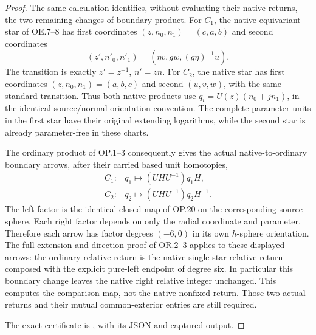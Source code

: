 \begin{proof}
\par\nobreak

The same calculation identifies, without evaluating their native
returns, the two remaining changes of boundary product. For \(C_1\),
the native equivariant star of OE.7--8 has first coordinates
\((z,n_0,n_1)=(c,a,b)\) and second coordinates
\[
 (z',n'_0,n'_1)=(\eta v,g w,(g\eta)^{-1}u).
\]
The transition is exactly \(z'=z^{-1}\), \(n'=zn\).
For \(C_2\), the native star has first coordinates
\((z,n_0,n_1)=(a,b,c)\) and second \((u,v,w)\), with the
same standard transition. Thus both native products use
\(q_i=U(z)(n_0+j\overline{n_1})\), in the identical source/normal
orientation convention. The complete parameter units in the first
star have their original extending logarithms, while the second
star is already parameter-free in these charts.

The ordinary product of OP.1--3 consequently gives the actual
native-to-ordinary boundary arrows, after their carried based unit
homotopies,
\[
 \begin{array}{ll}
 C_1:&q_1\longmapsto (UHU^{-1})q_1 H,\\
 C_2:&q_2\longmapsto (UHU^{-1})q_2 H^{-1}.
 \end{array}                                             \tag{OR.11}
\]
The left factor is the identical closed map of OP.20 on the
corresponding source sphere. Each right factor depends on only the
radial coordinate and parameter. Therefore each arrow has factor
degrees \((-6,0)\) in its own \(h\)-sphere orientation. The full
extension and direction proof of OR.2--3 applies to these displayed
arrows: the ordinary relative return is the native single-star
relative return composed with the explicit pure-left endpoint of
degree six. In particular this boundary change leaves the native
right relative integer unchanged. This computes the comparison
map, not the native nonfixed return. Those two actual returns and
their mutual common-exterior entries are still required.

The exact certificate is , with its JSON and captured output.
\end{proof}
